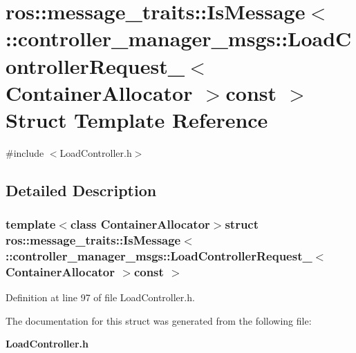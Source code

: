 \section{ros\-:\-:message\-\_\-traits\-:\-:\-Is\-Message$<$ \-:\-:controller\-\_\-manager\-\_\-msgs\-:\-:\-Load\-Controller\-Request\-\_\-$<$ \-Container\-Allocator $>$const $>$ \-Struct \-Template \-Reference}
\label{structros_1_1message__traits_1_1IsMessage_3_01_1_1controller__manager__msgs_1_1LoadControllerReqd470a7010c88d7d26c1a5cdd5b2111fd}


{\ttfamily \#include $<$\-Load\-Controller.\-h$>$}



\subsection{\-Detailed \-Description}
\subsubsection*{template$<$class Container\-Allocator$>$struct ros\-::message\-\_\-traits\-::\-Is\-Message$<$ \-::controller\-\_\-manager\-\_\-msgs\-::\-Load\-Controller\-Request\-\_\-$<$ Container\-Allocator $>$const  $>$}



\-Definition at line 97 of file \-Load\-Controller.\-h.



\-The documentation for this struct was generated from the following file\-:\begin{DoxyCompactItemize}
\item 
{\bf \-Load\-Controller.\-h}\end{DoxyCompactItemize}
